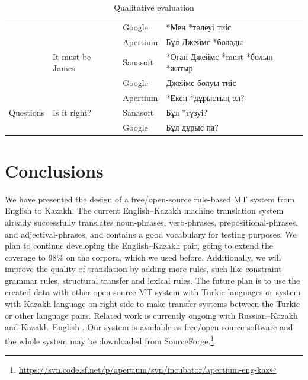 \documentclass[11pt]{article}
\begin{document}
\begin{table}
\begin{tabular}{|l|l|l|l|}
                                  &                                         & Google   & *Мен *төлеуі тиіс \\ %
                                  & \multirow{3}{*}{It must be James}       & Apertium & Бұл Джеймс *болады \\ %
                                  &                                         & Sanasoft & *Оған Джеймс *must *болып *жатыр  \\ %
                                  &                                         & Google   & Джеймс болуы тиіс \\ %
    \hline 
    \multirow{3}{*}{Questions}    & \multirow{3}{*}{Is it right?}           & Apertium & *Екен *дұрыстың ол? \\ %
                                  &                                         & Sanasoft & Бұл *түзуi? \\ %
                                  &                                         & Google   & Бұл дұрыс па? \\
    \hline 
  \end{tabular}

  \caption{Qualitative evaluation}
  \label{table:qualeval}
\end{table}

\section{Conclusions}

We have presented the design of a free/open-source rule-based MT system from English to Kazakh. The current English--Kazakh machine translation 
system already successfully translates noun-phrases, verb-phrases, prepositional-phrases, and adjectival-phrases, and 
contains a good vocabulary for testing purposes. 
We plan to continue developing the English--Kazakh pair, going to extend the coverage to 98\% on the corpora, 
which we used before. Additionally, we will improve the quality of translation by adding more rules, such like 
constraint grammar rules, structural transfer and lexical rules. The future plan is to use the created data with other 
open-source MT system with Turkic languages or system with Kazakh language on right side to make transfer systems 
between the Turkic or other language pairs. Related work is currently ongoing with Russian--Kazakh and Kazakh--English \citep{sundetova14}.
Our system is available as free/open-source software and the whole system may be downloaded 
from SourceForge.\footnote{\url{https://svn.code.sf.net/p/apertium/svn/incubator/apertium-eng-kaz}}
\end{document}
